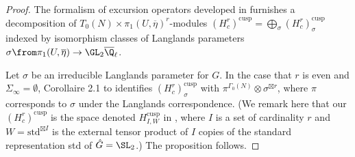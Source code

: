 \documentclass{article}
\begin{document}
\begin{proof}  The formalism of excursion operators developed in \cite{VincentLafforgueChtoucas} furnishes a decomposition of $T_0(N)\times \pi_1(U,\overline{\eta})^r$-modules $(H^r_c)^{\mathrm{cusp}}=\bigoplus_{\sigma} (H^r_c)^{\mathrm{cusp}}_\sigma$ indexed by isomorphism classes of Langlands parameters $\sigma\from \pi_1(U,\overline{\eta}) \to \GL_2\overline{\Q}_\ell$. 

Let $\sigma$ be an irreducible Langlands parameter for $G$.   In the case that $r$ is even and $\Sigma_\infty=\emptyset$,  Corollaire 2.1 to  \cite[Proposition 1.2]{LafforgueZhu} identifies $(H^r_c)^{\mathrm{cusp}}_{\sigma}$ with $\pi^{\Gamma_0(N)}\otimes \sigma^{\boxtimes r}$, where $\pi$ corresponds to $\sigma$ under the Langlands correspondence.   (We remark here that our $(H^r_c)^{\mathrm{cusp}}$ is the space denoted $H^{\text{cusp}}_{I,W}$ in \cite{LafforgueZhu}, where $I$ is a set of cardinality $r$ and $W=\mathrm{std}^{\boxtimes I}$ is the external tensor product of $I$ copies of the standard representation std of $\hat{G}=\SL_2$.)  The proposition follows.



\end{proof}
\end{document}
